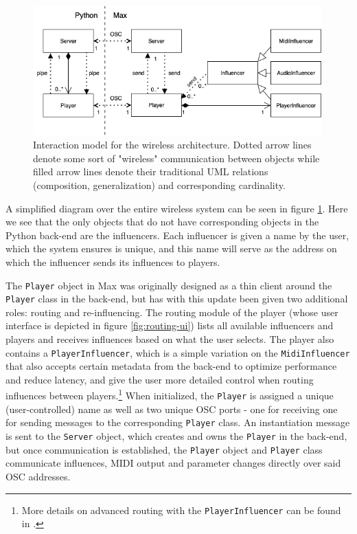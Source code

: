  \begin{figure}[h!]
    \centering        
 	\includegraphics[width=0.99\textwidth,keepaspectratio]{figures/communication.png}
    \caption{Interaction model for the wireless architecture. Dotted arrow lines denote some sort of "wireless" communication between objects while filled arrow lines denote their traditional UML relations (composition, generalization) and corresponding cardinality.}
    \label{fig:somax-communication}
\end{figure}

A simplified diagram over the entire wireless system can be seen in figure \ref{fig:somax-communication}. Here we see that the only objects that do not have corresponding objects in the Python back-end are the influencers. Each influencer is given a name by the user, which the system ensures is unique, and this name will serve as the address on which the influencer sends its influences to players. 

The \texttt{Player} object in Max was originally designed as a thin client around the \texttt{Player} class in the back-end, but has with this update been given two additional roles: routing and re-influencing. The routing module of the player (whose user interface is depicted in figure \ref{fig:routing-ui}) lists all available influencers and players and receives influences based on what the user selects. The player also contains a \texttt{PlayerInfluencer}, which is a simple variation on the \texttt{MidiInfluencer} that also accepts certain metadata from the back-end to optimize performance and reduce latency, and give the user more detailed control when routing influences between players.\footnote{More details on advanced routing with the \texttt{PlayerInfluencer} can be found in \cite{somaxoverview2021}.} When initialized, the \texttt{Player} is assigned a unique (user-controlled) name as well as two unique OSC ports - one for receiving one for sending messages to the corresponding \texttt{Player} class. An instantiation message is sent to the \texttt{Server} object, which creates and owns the \texttt{Player} in the back-end, but once communication is established, the \texttt{Player} object and \texttt{Player} class communicate influences, MIDI output and parameter changes directly over said OSC addresses. 


